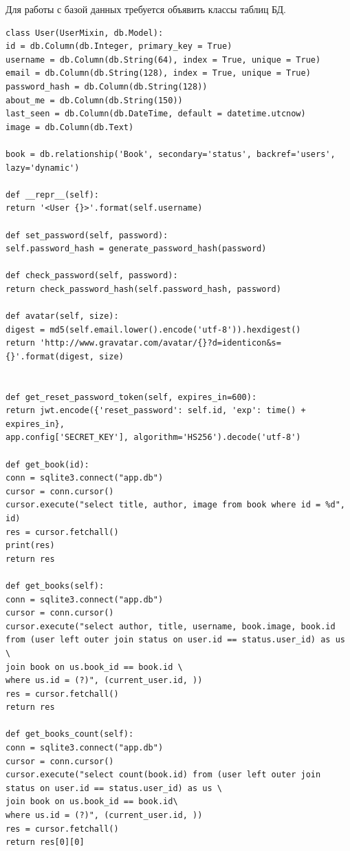 \documentclass[12pt]{article}
\begin{document}
Для работы с базой данных требуется объявить классы таблиц БД.

\begin{lstlisting}[label=some-code, caption=Класс <<Пользователи>>]
class User(UserMixin, db.Model):
id = db.Column(db.Integer, primary_key = True)
username = db.Column(db.String(64), index = True, unique = True)
email = db.Column(db.String(128), index = True, unique = True)
password_hash = db.Column(db.String(128))
about_me = db.Column(db.String(150))
last_seen = db.Column(db.DateTime, default = datetime.utcnow)
image = db.Column(db.Text)

book = db.relationship('Book', secondary='status', backref='users', lazy='dynamic')

def __repr__(self):
return '<User {}>'.format(self.username)

def set_password(self, password):
self.password_hash = generate_password_hash(password)

def check_password(self, password):
return check_password_hash(self.password_hash, password)

def avatar(self, size):
digest = md5(self.email.lower().encode('utf-8')).hexdigest()
return 'http://www.gravatar.com/avatar/{}?d=identicon&s={}'.format(digest, size)


def get_reset_password_token(self, expires_in=600):
return jwt.encode({'reset_password': self.id, 'exp': time() + expires_in},
app.config['SECRET_KEY'], algorithm='HS256').decode('utf-8')

def get_book(id):
conn = sqlite3.connect("app.db")
cursor = conn.cursor()
cursor.execute("select title, author, image from book where id = %d", id)
res = cursor.fetchall()
print(res)
return res

def get_books(self):
conn = sqlite3.connect("app.db")
cursor = conn.cursor()
cursor.execute("select author, title, username, book.image, book.id from (user left outer join status on user.id == status.user_id) as us \
join book on us.book_id == book.id \
where us.id = (?)", (current_user.id, ))
res = cursor.fetchall()
return res

def get_books_count(self):
conn = sqlite3.connect("app.db")
cursor = conn.cursor()
cursor.execute("select count(book.id) from (user left outer join status on user.id == status.user_id) as us \
join book on us.book_id == book.id\
where us.id = (?)", (current_user.id, ))
res = cursor.fetchall()
return res[0][0]
\end{lstlisting}
\end{document}
